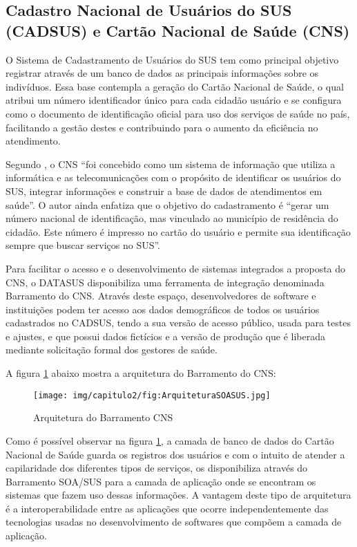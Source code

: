 \subsection{\textbf{Cadastro Nacional de Usuários do SUS (CADSUS) e Cartão Nacional de Saúde (CNS)}}


O Sistema de Cadastramento de Usuários do SUS tem como principal objetivo registrar através de um banco de dados as principais informações sobre os indivíduos.  Essa base contempla a geração do Cartão Nacional de Saúde, o qual atribui um número identificador único para cada cidadão usuário e se configura como o documento de identificação oficial para uso dos serviços de saúde no país, facilitando a gestão destes e contribuindo para o aumento da eficiência no atendimento.

Segundo , o CNS ``foi concebido como um sistema de informação que utiliza a informática e as telecomunicações com o propósito de identificar os usuários do SUS, integrar informações e construir a base de dados de atendimentos em saúde''. O autor ainda enfatiza que o objetivo do cadastramento é ``gerar um número nacional de identificação, mas vinculado ao município de residência do cidadão. Este número é impresso no cartão do usuário e permite sua identificação sempre que buscar serviços no SUS''.

Para facilitar o acesso e o desenvolvimento de sistemas integrados a proposta do CNS, o DATASUS disponibiliza uma ferramenta de integração denominada Barramento do CNS. Através deste espaço, desenvolvedores de software e instituições podem ter acesso aos dados demográficos de todos os usuários cadastrados no CADSUS, tendo a sua versão de acesso público, usada para testes e ajustes, e que possui dados fictícios e a versão de produção que é liberada mediante solicitação formal dos gestores de saúde.

A figura \ref{fig:ArquiteturaSOASUS} abaixo mostra a arquitetura do Barramento do CNS:

\begin{figure}[H]
    \centering
     \caption{Arquitetura do Barramento CNS}
    \texttt{[image: img/capitulo2/fig:ArquiteturaSOASUS.jpg]}
    \label{fig:ArquiteturaSOASUS}
\end{figure}

Como é possível observar na figura \ref{fig:ArquiteturaSOASUS}, a camada de banco de dados do Cartão Nacional de Saúde guarda os registros dos usuários e  com o intuito de atender a capilaridade dos diferentes tipos de serviços, os disponibiliza através do Barramento SOA/SUS para a camada de aplicação onde se encontram os sistemas que fazem uso dessas informações. A vantagem deste tipo de arquitetura é a interoperabilidade entre as aplicações que ocorre independentemente das tecnologias usadas no desenvolvimento de softwares que compõem a camada de aplicação. 




